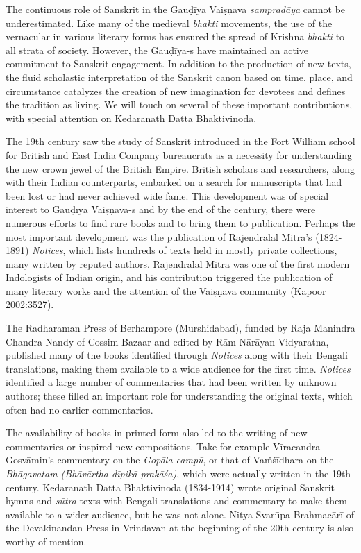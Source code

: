 The continuous role of Sanskrit in the Gauḍīya Vaiṣṇava {\sl sampradāya} cannot be underestimated. Like many of the medieval {\sl bhakti} movements, the use of the vernacular in various literary forms has ensured the spread of Krishna {\sl bhakti} to all strata of society. However, the Gauḍīya-s have maintained an active commitment to Sanskrit engagement. In addition to the production of new texts, the fluid scholastic interpretation of the Sanskrit canon based on time, place, and circumstance catalyzes the creation of new imagination for devotees and defines the tradition as living. We will touch on several of these important contributions, with special attention on Kedaranath Datta Bhaktivinoda. 

The 19th century saw the study of Sanskrit introduced in the Fort William school for British and East India Company bureaucrats as a necessity for understanding the new crown jewel of the British Empire. British scholars and researchers, along with their Indian counterparts, embarked on a search for manuscripts that had been lost or had never achieved wide fame. This development was of special interest to Gauḍīya Vaiṣṇava-s and by the end of the century, there were numerous efforts to find rare books and to bring them to publication. Perhaps the most important development was the publication of Rajendralal Mitra's (1824-1891) {\sl Notices}, which lists hundreds of texts held in mostly private collections, many written by reputed authors. Rajendralal Mitra was one of the first modern Indologists of Indian origin, and his contribution triggered the publication of many literary works and the attention of the Vaiṣṇava community (Kapoor 2002:3527). 

The Radharaman Press of Berhampore (Murshidabad), funded by Raja Manindra Chandra Nandy of Cossim Bazaar and edited by Rām Nārāyan Vidyaratna, published many of the books identified through {\sl Notices} along with their Bengali translations, making them available to a wide audience for the first time. {\sl Notices} identified a large number of commentaries that had been written by unknown authors; these filled an important role for understanding the original texts, which often had no earlier commentaries. 

The availability of books in printed form also led to the writing of new commentaries or inspired new compositions. Take for example Vīracandra Gosvāmin's commentary on the {\sl Gopāla-campū}, or that of Vaṁśīdhara on the {\sl Bhāgavatam (Bhāvārtha-dīpikā-prakāśa)}, which were actually written in the 19th century. Kedaranath Datta Bhaktivinoda (1834-1914) wrote original Sanskrit hymns and {\sl sūtra} texts with Bengali translations and commentary to make them available to a wider audience, but he was not alone. Nitya Svarūpa Brahmacārī of the Devakinandan Press in Vrindavan at the beginning of the 20th century is also worthy of mention.
\vskip 2pt


